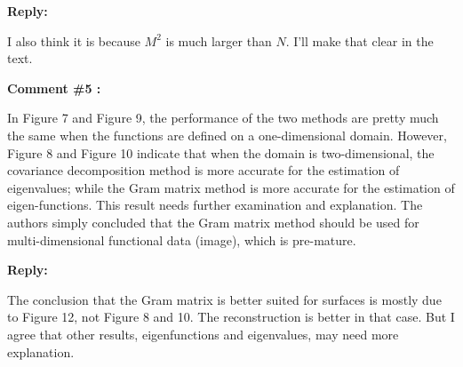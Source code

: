 \documentclass[11pt]{article}
\begin{document}
\medskip

\normalfont

\textbf{Reply:} 

I also think it is because $M^2$ is much larger than $N$. I'll make that clear in the text.

\bigskip

\itshape


\textbf{Comment \#5 :}

In Figure 7 and Figure 9, the performance of the two methods are pretty much the same when the functions are defined on a one-dimensional domain. However, Figure 8 and Figure 10 indicate that when the domain is two-dimensional, the covariance decomposition method is more accurate for the estimation of eigenvalues; while the Gram matrix method is more accurate for the estimation of eigen-functions. This result needs further examination and explanation. The authors simply concluded that the Gram matrix method should be used for multi-dimensional functional data (image), which is pre-mature.

\medskip

\normalfont

\textbf{Reply:} 

The conclusion that the Gram matrix is better suited for surfaces is mostly due to Figure 12, not Figure 8 and 10. The reconstruction is better in that case. 
But I agree that other results, eigenfunctions and eigenvalues, may need more explanation. 


 
\end{document}
